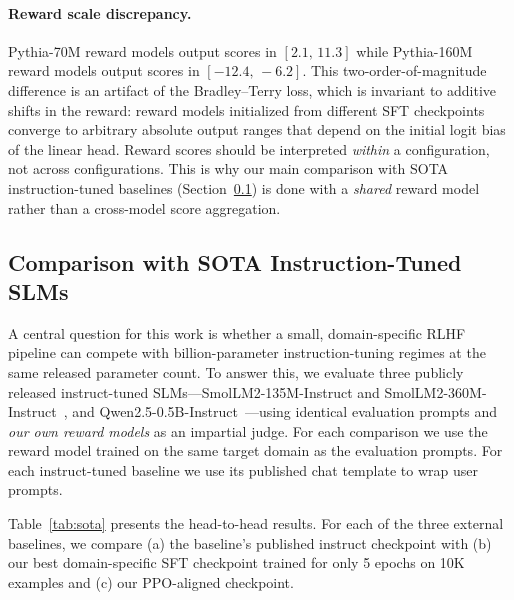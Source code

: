 \documentclass[10pt,twocolumn,letterpaper]{article}
\begin{document}
\paragraph{Reward scale discrepancy.}
Pythia-70M reward models output scores in $[2.1,\,11.3]$ while Pythia-160M reward models output scores in $[-12.4,\,-6.2]$. This two-order-of-magnitude difference is an artifact of the Bradley--Terry loss, which is invariant to additive shifts in the reward: reward models initialized from different SFT checkpoints converge to arbitrary absolute output ranges that depend on the initial logit bias of the linear head. Reward scores should be interpreted \emph{within} a configuration, not across configurations. This is why our main comparison with SOTA instruction-tuned baselines (Section~\ref{sec:sota}) is done with a \emph{shared} reward model rather than a cross-model score aggregation.

\subsection{Comparison with SOTA Instruction-Tuned SLMs}
\label{sec:sota}

A central question for this work is whether a small, domain-specific RLHF pipeline can compete with billion-parameter instruction-tuning regimes at the same released parameter count. To answer this, we evaluate three publicly released instruct-tuned SLMs---SmolLM2-135M-Instruct and SmolLM2-360M-Instruct~\cite{allal2025smollm2}, and Qwen2.5-0.5B-Instruct~\cite{qwen2025technical}---using identical evaluation prompts and \emph{our own reward models} as an impartial judge. For each comparison we use the reward model trained on the same target domain as the evaluation prompts. For each instruct-tuned baseline we use its published chat template to wrap user prompts.

Table~\ref{tab:sota} presents the head-to-head results. For each of the three external baselines, we compare (a) the baseline's published instruct checkpoint with (b) our best domain-specific SFT checkpoint trained for only 5 epochs on 10K examples and (c) our PPO-aligned checkpoint.
\end{document}

